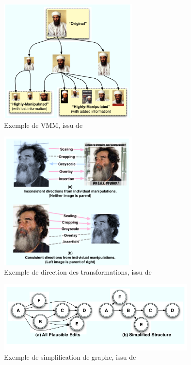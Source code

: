 \documentclass[utf8]{stageM2R} %
\begin{document}
\begin{figure}
  \begin{center}
    \includegraphics[width=70mm]{images/vmm.png}
    \caption{Exemple de VMM, issu de \cite{kennedy2008internet}}
    \label{vmm}
  \end{center}
\end{figure}

\begin{figure}
  \begin{center}
    \includegraphics[width=70mm]{images/vmm_directionnel.png}
    \caption{Exemple de direction des transformations, issu de \cite{kennedy2008internet}}
    \label{vmm-directionnel}
  \end{center}
\end{figure}

\begin{figure}
  \begin{center}
    \includegraphics[width=100mm]{images/vmm_tree.png}
    \caption{Exemple de simplification de graphe, issu de \cite{kennedy2008internet}}
    \label{vmm-tree}
  \end{center}
\end{figure}
\end{document}
